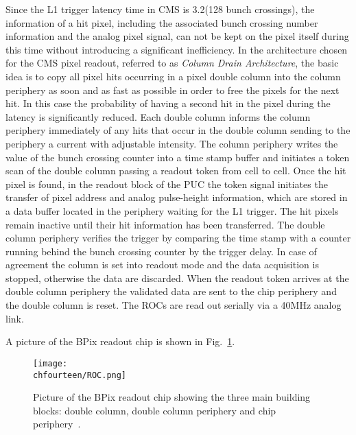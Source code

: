 Since the L1 trigger latency time in CMS is 3.2\mus (128 bunch crossings), the information of a hit pixel, including the associated bunch crossing number information and the analog pixel signal, can not be kept on the pixel itself during this time without introducing a significant inefficiency. In the architecture chosen for the CMS pixel readout, referred to as {\itshape Column Drain Architecture}, the basic idea is to copy all pixel hits occurring in a pixel double column into the column periphery as soon and as fast as possible in order to free the pixels for the next hit. In this case the probability of having a second hit in the pixel during the latency is significantly reduced.
Each double column informs the column periphery immediately of any hits that occur in the double column sending to the periphery a current with adjustable intensity.
The column periphery writes the value of the bunch crossing counter into a time stamp buffer and initiates a token scan of the double column passing a readout token from cell to cell.
Once the hit pixel is found, in the readout block of the PUC the token signal initiates the transfer of pixel address and analog pulse-height information, which are stored in a data buffer located in the periphery waiting for the L1 trigger. The hit pixels remain inactive until their hit information has been transferred.
The double column periphery verifies the trigger by comparing the time stamp with a counter running behind the bunch crossing counter by the trigger delay. In case of agreement the column is set into readout mode and the data acquisition is stopped, otherwise the data are discarded. When the readout token arrives at the double column periphery the validated data are sent to the chip periphery and the double column is reset. The ROCs are read out serially via a 40\unit{MHz} analog link.

A picture of the BPix readout chip is shown in Fig.~\ref{fig:ROC}.

\begin{figure}[!htb]
 \begin{center}
 \texttt{[image: \\chfourteen/ROC.png]}
 \end{center}
 \caption{Picture of the BPix readout chip showing the three main building blocks: double column, double column periphery and chip periphery~\cite{Chatrchyan:2008zzk}.}
 \label{fig:ROC}
\end{figure}

